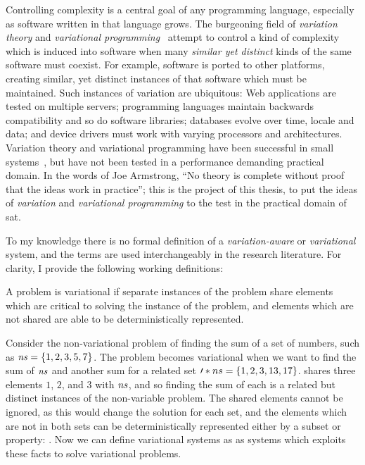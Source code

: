 \label{chapter:introduction}%
%
Controlling complexity is a central goal of any programming language, especially
as software written in that language grows. The burgeoning field of
\emph{variation theory} and \emph{variational
  programming}~\cite{EW11gttse,EW11tosem,HW16fosd,CEW16ecoop,Walk14onward}
attempt to control a kind of complexity which is induced into software when many
\emph{similar yet distinct} kinds of the same software must coexist. For
example, software is ported to other platforms, creating similar, yet distinct
instances of that software which must be maintained. Such instances of variation
are ubiquitous: Web applications are tested on multiple servers; programming
languages maintain backwards compatibility and so do software libraries;
databases evolve over time, locale and data; and device drivers must work with
varying processors and architectures. Variation theory and variational
programming have been successful in small
systems~\cite{ES18diagrams,SE17fosd,MMWWK17vamos}, but have not been tested in
a performance demanding practical domain. In the words of Joe
Armstrong\cite{armstrongThesis}, ``No theory is complete without proof that the
ideas work in practice''; this is the project of this thesis, to put the ideas
of \emph{variation} and \emph{variational programming} to the test in the
practical domain of \acl{sat}.

To my knowledge there is no formal definition of a \emph{variation-aware} or
\emph{variational} system, and the terms are used interchangeably in the
research literature. For clarity, I provide the following working definitions:

\begin{definition}
  A problem is variational if separate instances of the problem share elements
  which are critical to solving the instance of the problem, and elements which
  are not shared are able to be deterministically represented.
\end{definition}
%
Consider the non-variational problem of finding the sum of a set of numbers,
such as $\kf{ns} = \set{1,2,3,5,7}$. The problem becomes variational when we
want to find the sum of $\mathit{ns}$ and another sum for a related set $\prime*{ns}
= \set{1,2,3,13,17}$.  shares three elements $1$, $2$, and $3$ with
$\mathit{ns}$, and so finding the sum of each is a related but distinct instances of
the non-variable problem. The shared elements cannot be ignored, as this would
change the solution for each set, and the elements which are not in both sets
can be deterministically represented either by a subset or property: .
%
Now we can define variational systems as as systems which exploits these facts
to solve variational problems.

